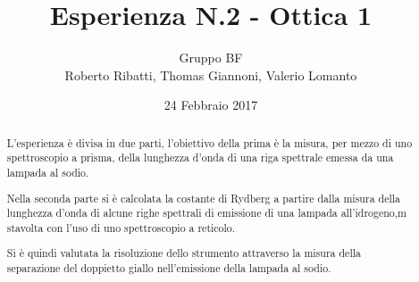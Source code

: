 \documentclass[a4paper,11pt]{article}
\author{Gruppo BF \\ Roberto Ribatti, Thomas Giannoni, Valerio Lomanto}
\title{Esperienza N.2 - Ottica 1}
\date{24 Febbraio 2017}
\begin{document}
\maketitle

\begin{abstract}
L'esperienza è divisa in due parti, l'obiettivo della prima è la misura, per mezzo di uno 
spettroscopio a prisma, della lunghezza d'onda di una riga spettrale
emessa da una lampada al sodio.

Nella seconda parte si è calcolata la costante di Rydberg a partire dalla misura della lunghezza d'onda di alcune righe spettrali di emissione di una lampada all'idrogeno,m stavolta con l'uso di uno spettroscopio a reticolo. 

Si è quindi valutata la risoluzione dello strumento attraverso la misura della separazione del doppietto giallo nell'emissione della lampada al sodio.

\end{abstract}



% 


%
\end{document}
